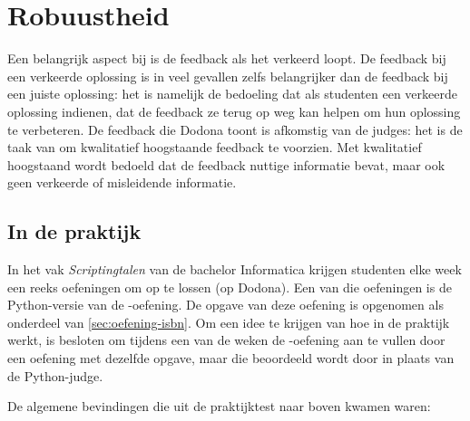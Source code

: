 \section{Robuustheid}\label{sec:robuustheid}

Een belangrijk aspect bij  is de feedback als het verkeerd loopt.
De feedback bij een verkeerde oplossing is in veel gevallen zelfs belangrijker dan de feedback bij een juiste oplossing: het is namelijk de bedoeling dat als studenten een verkeerde oplossing indienen, dat de feedback ze terug op weg kan helpen om hun oplossing te verbeteren.
De feedback die Dodona toont is afkomstig van de judges: het is de taak van \tested{} om kwalitatief hoogstaande feedback te voorzien.
Met kwalitatief hoogstaand wordt bedoeld dat de feedback nuttige informatie bevat, maar ook geen verkeerde of misleidende informatie.

\subsection{In de praktijk}\label{subsec:in-de-praktijk}

In het vak \emph{Scriptingtalen} van de bachelor Informatica krijgen studenten elke week een reeks oefeningen om op te lossen (op Dodona).
Een van die oefeningen is de Python-versie van de \emph{}-oefening.
De opgave van deze oefening is opgenomen als onderdeel van \cref{sec:oefening-isbn}.
Om een idee te krijgen van hoe \tested{} in de praktijk werkt, is besloten om tijdens een van de weken de \emph{}-oefening aan te vullen door een oefening met dezelfde opgave, maar die beoordeeld wordt door \tested{} in plaats van de Python-judge.

De algemene bevindingen die uit de praktijktest naar boven kwamen waren:


